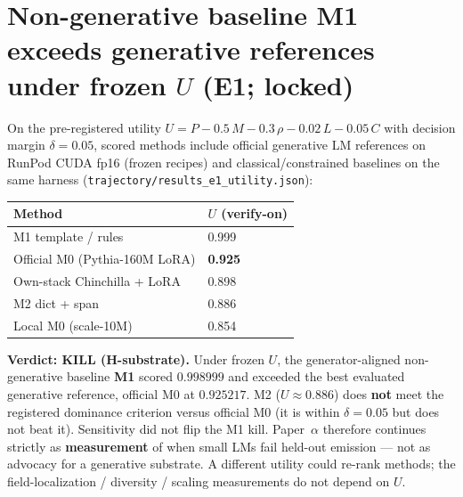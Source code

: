 \documentclass[11pt]{article}
\begin{document}
\begin{abstract}
contribution: single-instance evaluation was under-powered, and at 1B \textbf{training-run nondeterminism} dominates the residual. Both lessons arose from empirical failures of the prior instrument, not from foresight.
\end{abstract}

\setcounter{section}{-1}
\section{Non-generative baseline M1 exceeds generative references under frozen $U$ (E1; locked)}\label{sec:e1}

On the pre-registered utility $U = P - 0.5\,M - 0.3\,\rho - 0.02\,L - 0.05\,C$ with decision margin $\delta=0.05$, scored methods include official generative LM references on RunPod CUDA fp16 (frozen recipes) and classical/constrained baselines on the same harness (\texttt{trajectory/results\_e1\_utility.json}):

 \begin{center}
\begin{tabular}{ll}
\toprule
Method & $U$ (verify-on) \\
\midrule
M1 template / rules & 0.999 \\
Official M0 (Pythia-160M LoRA) & \textbf{0.925} \\
Own-stack Chinchilla + LoRA & 0.898 \\
M2 dict + span & 0.886 \\
Local M0 (scale-10M) & 0.854 \\
\bottomrule
\end{tabular}
\end{center}

\textbf{Verdict: KILL (H-substrate).} Under frozen $U$, the generator-aligned non-generative baseline \textbf{M1} scored $0.998999$ and exceeded the best evaluated generative reference, official M0 at $0.925217$. M2 ($U\approx0.886$) does \textbf{not} meet the registered dominance criterion versus official M0 (it is within $\delta=0.05$ but does not beat it). Sensitivity did not flip the M1 kill. Paper~$\alpha$ therefore continues strictly as \textbf{measurement} of when small LMs fail held-out emission --- not as advocacy for a generative substrate. A different utility could re-rank methods; the field-localization / diversity / scaling measurements do not depend on $U$.
\end{document}
